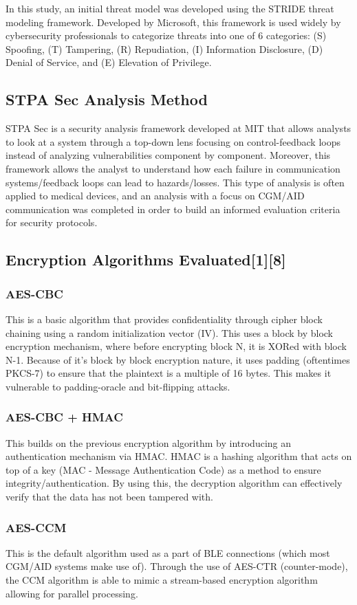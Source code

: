 \documentclass[conference]{IEEEtran}
\begin{document}
In this study, an initial threat model was developed using the STRIDE threat modeling framework. Developed by Microsoft, this framework is used widely by cybersecurity professionals to categorize threats into one of 6 categories: (S) Spoofing, (T) Tampering, (R) Repudiation, (I) Information Disclosure, (D) Denial of Service, and (E) Elevation of Privilege.  

\subsection{STPA Sec Analysis Method}
STPA Sec is a security analysis framework developed at MIT that allows analysts to look at a system through a top-down lens focusing on control-feedback loops instead of analyzing vulnerabilities component by component. Moreover, this framework allows the analyst to understand how each failure in communication systems/feedback loops can lead to hazards/losses. This type of analysis is often applied to medical devices, and an analysis with a focus on CGM/AID communication was completed in order to build an informed evaluation criteria for security protocols.

\subsection{Encryption Algorithms Evaluated[1][8]}\label{key}
\subsubsection{AES-CBC}
This is a basic algorithm that provides confidentiality through cipher block chaining using a random initialization vector (IV). This uses a block by block encryption mechanism, where before encrypting block N, it is XORed with block N-1. Because of it's block by block encryption nature, it uses padding (oftentimes PKCS-7) to ensure that the plaintext is a multiple of 16 bytes. This makes it vulnerable to padding-oracle and bit-flipping attacks.
\subsubsection{AES-CBC + HMAC}
This builds on the previous encryption algorithm by introducing an authentication mechanism via HMAC. HMAC is a hashing algorithm that acts on top of a key (MAC - Message Authentication Code) as a method to ensure integrity/authentication. By using this, the decryption algorithm can effectively verify that the data has not been tampered with. 
\subsubsection{AES-CCM}
This is the default algorithm used as a part of BLE connections (which most CGM/AID systems make use of). Through the use of AES-CTR (counter-mode), the CCM algorithm is able to mimic a stream-based encryption algorithm allowing for parallel processing.
\end{document}
